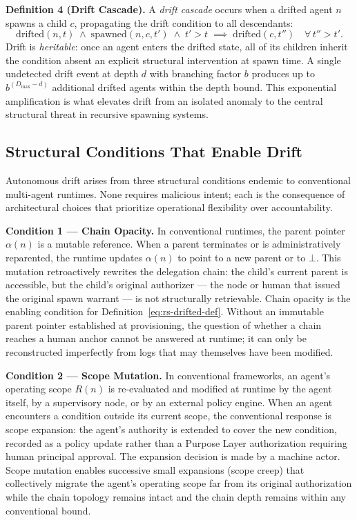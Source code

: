 \medskip
\noindent\textbf{Definition 4 (Drift Cascade).}
A \emph{drift cascade} occurs when a drifted agent $n$ spawns a child $c$, propagating the drift condition to all descendants:
\begin{equation}
\mathrm{drifted}(n, t) \;\land\; \mathrm{spawned}(n, c, t') \;\land\; t' > t \;\implies\; \mathrm{drifted}(c, t'') \quad \forall\, t'' > t'.
\label{eq:rs-drift-cascade}
\end{equation}
Drift is \emph{heritable}: once an agent enters the drifted state, all of its children inherit the condition absent an explicit structural intervention at spawn time. A single undetected drift event at depth $d$ with branching factor $b$ produces up to $b^{(D_{\max} - d)}$ additional drifted agents within the depth bound. This exponential amplification is what elevates drift from an isolated anomaly to the central structural threat in recursive spawning systems.

\subsection{Structural Conditions That Enable Drift}
\label{sec:rs-drift-conditions}

Autonomous drift arises from three structural conditions endemic to conventional multi-agent runtimes. None requires malicious intent; each is the consequence of architectural choices that prioritize operational flexibility over accountability.

\medskip
\noindent\textbf{Condition 1 — Chain Opacity.}
In conventional runtimes, the parent pointer $\alpha(n)$ is a mutable reference. When a parent terminates or is administratively reparented, the runtime updates $\alpha(n)$ to point to a new parent or to $\bot$. This mutation retroactively rewrites the delegation chain: the child's current parent is accessible, but the child's original authorizer — the node or human that issued the original spawn warrant — is not structurally retrievable. Chain opacity is the enabling condition for Definition~\ref{eq:rs-drifted-def}. Without an immutable parent pointer established at provisioning, the question of whether a chain reaches a human anchor cannot be answered at runtime; it can only be reconstructed imperfectly from logs that may themselves have been modified.

\medskip
\noindent\textbf{Condition 2 — Scope Mutation.}
In conventional frameworks, an agent's operating scope $R(n)$ is re-evaluated and modified at runtime by the agent itself, by a supervisory node, or by an external policy engine. When an agent encounters a condition outside its current scope, the conventional response is scope expansion: the agent's authority is extended to cover the new condition, recorded as a policy update rather than a Purpose Layer authorization requiring human principal approval. The expansion decision is made by a machine actor. Scope mutation enables successive small expansions (scope creep) that collectively migrate the agent's operating scope far from its original authorization while the chain topology remains intact and the chain depth remains within any conventional bound.

